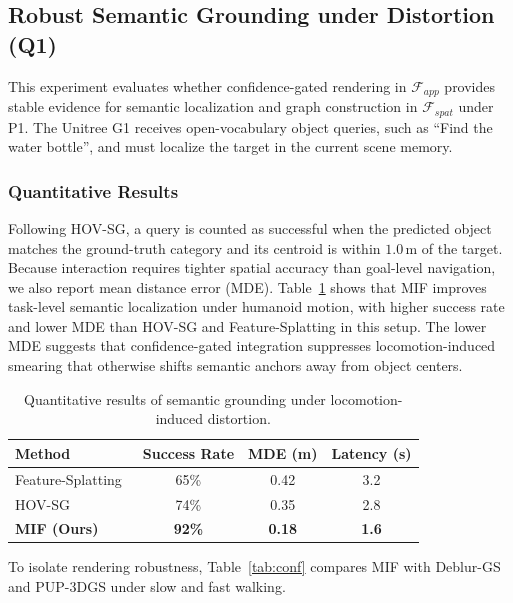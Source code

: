 \documentclass[conference]{IEEEtran}
\begin{document}
\subsection{Robust Semantic Grounding under Distortion (Q1)}
\label{sec:exp_semantic_grounding}
%
This experiment evaluates whether confidence-gated rendering in $\mathcal{F}_{app}$ provides stable evidence for semantic localization and graph construction in $\mathcal{F}_{spat}$ under P1.
%
The Unitree G1 receives open-vocabulary object queries, such as ``Find the water bottle'', and must localize the target in the current scene memory.


\subsubsection{Quantitative Results}
%
Following HOV-SG, a query is counted as successful when the predicted object matches the ground-truth category and its centroid is within $1.0\,\text{m}$ of the target.
%
Because interaction requires tighter spatial accuracy than goal-level navigation, we also report mean distance error (MDE).
%
Table~\ref{tab:semantic_results} shows that MIF improves task-level semantic localization under humanoid motion, with higher success rate and lower MDE than HOV-SG and Feature-Splatting in this setup.
%
The lower MDE suggests that confidence-gated integration suppresses locomotion-induced smearing that otherwise shifts semantic anchors away from object centers.

\begin{table}[h]
\centering
\footnotesize
\caption{Quantitative results of semantic grounding under locomotion-induced distortion.}
\label{tab:semantic_results}
\begin{tabular}{@{}lccc@{}}
\toprule
\textbf{Method} & \textbf{Success Rate} & \textbf{MDE (m)} & \textbf{Latency (s)} \\ \midrule
Feature-Splatting~\cite{qiu2024featuresplatting} & 65\% & 0.42 & 3.2 \\
HOV-SG~\cite{Werby-RSS-24} & 74\% & 0.35 & 2.8 \\
\textbf{MIF (Ours)} & \textbf{92\%} & \textbf{0.18} & \textbf{1.6} \\ \bottomrule
\end{tabular}
\end{table}

%
To isolate rendering robustness, Table~\ref{tab:conf} compares MIF with Deblur-GS and PUP-3DGS under slow and fast walking.
\end{document}
